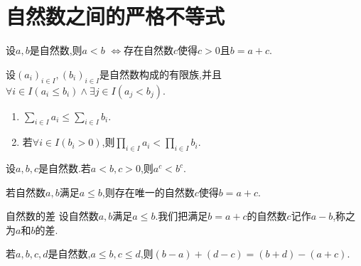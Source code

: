 \section{自然数之间的严格不等式}

\begin{proposition}{}{}
	设$a,b$是自然数,则$a<b$ $\iff$存在自然数$c$使得$c>0$且$b=a+c$.
\end{proposition}

\begin{proposition}{}{}
	设$\left(a_{i}\right)_{i\in I},\left(b_{i}\right)_{i\in I}$是自然数构成的有限族,并且$\forall i\in I\left(a_{i}\leq b_{i}\right)\wedge\exists j\in I\left(a_{j}<b_{j}\right)$.
	\begin{enumerate}
		\item $\sum\limits_{i\in I}a_{i}\leq\sum\limits_{i\in I}b_{i}$.
		\item 若$\forall i\in I\left(b_{i}>0\right)$,则$\prod\limits_{i\in I}a_{i}<\prod\limits_{i\in I}b_{i}$.
	\end{enumerate}
\end{proposition}

\begin{corollary}{}{}
	设$a,b,c$是自然数.若$a<b,c>0$,则$a^{c}<b^{c}$.
\end{corollary}

\begin{corollary}{}{}
	若自然数$a,b$满足$a\leq b$,则存在唯一的自然数$c$使得$b=a+c$.
\end{corollary}

\begin{definition}{自然数的差}{}
	设自然数$a,b$满足$a\leq b$.我们把满足$b=a+c$的自然数$c$记作$a-b$,称之为$a$和$b$的差.
\end{definition}

\begin{proposition}{}{}
	若$a,b,c,d$是自然数,$a\leq b,c\leq d$,则$\left(b-a\right)+\left(d-c\right)=\left(b+d\right)-\left(a+c\right)$.
\end{proposition}










































